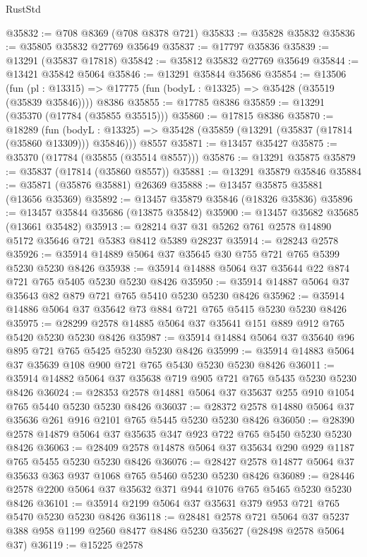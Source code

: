 \begin{lexlean}{RustStd}
\begin{coremodule}
@35832 := @708 @8369 (@708 @8378 @721)
@35833 := @35828 @35832
@35836 := @35805 @35832 @27769 @35649
@35837 := @17797 @35836
@35839 := @13291 (@35837 @17818)
@35842 := @35812 @35832 @27769 @35649
@35844 := @13421 @35842 @5064
@35846 := @13291 @35844 @35686
@35854 := @13506
    (fun (pl : @13315) => @17775 (fun (bodyL : @13325) => @35428 (@35519 (@35839 @35846))))
    @8386
@35855 := @17785 @8386
@35859 := @13291 (@35370 (@17784 (@35855 @35515)))
@35860 := @17815 @8386
@35870 := @18289
    (fun (bodyL : @13325) => @35428 (@35859 (@13291 (@35837 (@17814 (@35860 @13309))) @35846)))
    @8557
@35871 := @13457 @35427
@35875 := @35370 (@17784 (@35855 (@35514 @8557)))
@35876 := @13291 @35875
@35879 := @35837 (@17814 (@35860 @8557))
@35881 := @13291 @35879 @35846
@35884 := @35871 (@35876 @35881) @26369
@35888 := @13457 @35875 @35881 (@13656 @35369)
@35892 := @13457 @35879 @35846 (@18326 @35836)
@35896 := @13457 @35844 @35686 (@13875 @35842)
@35900 := @13457 @35682 @35685 (@13661 @35482)
@35913 := @28214 @37 @31 @5262 @761 @2578 @14890 @5172 @35646 @721 @5383 @8412 @5389 @28237
@35914 := @28243 @2578
@35926 := @35914 @14889 @5064 @37 @35645 @30 @755 @721 @765 @5399 @5230 @5230 @8426
@35938 := @35914 @14888 @5064 @37 @35644 @22 @874 @721 @765 @5405 @5230 @5230 @8426
@35950 := @35914 @14887 @5064 @37 @35643 @82 @879 @721 @765 @5410 @5230 @5230 @8426
@35962 := @35914 @14886 @5064 @37 @35642 @73 @884 @721 @765 @5415 @5230 @5230 @8426
@35975 := @28299 @2578 @14885 @5064 @37 @35641 @151 @889 @912 @765 @5420 @5230 @5230 @8426
@35987 := @35914 @14884 @5064 @37 @35640 @96 @895 @721 @765 @5425 @5230 @5230 @8426
@35999 := @35914 @14883 @5064 @37 @35639 @108 @900 @721 @765 @5430 @5230 @5230 @8426
@36011 := @35914 @14882 @5064 @37 @35638 @719 @905 @721 @765 @5435 @5230 @5230 @8426
@36024 := @28353 @2578 @14881 @5064 @37 @35637 @255 @910 @1054 @765 @5440 @5230 @5230 @8426
@36037 := @28372 @2578 @14880 @5064 @37 @35636 @261 @916 @2101 @765 @5445 @5230 @5230 @8426
@36050 := @28390 @2578 @14879 @5064 @37 @35635 @347 @923 @722 @765 @5450 @5230 @5230 @8426
@36063 := @28409 @2578 @14878 @5064 @37 @35634 @290 @929 @1187 @765 @5455 @5230 @5230 @8426
@36076 := @28427 @2578 @14877 @5064 @37 @35633 @363 @937 @1068 @765 @5460 @5230 @5230 @8426
@36089 := @28446 @2578 @2200 @5064 @37 @35632 @371 @944 @1076 @765 @5465 @5230 @5230 @8426
@36101 := @35914 @2199 @5064 @37 @35631 @379 @953 @721 @765 @5470 @5230 @5230 @8426
@36118 := @28481
    @2578
    @721
    @5064
    @37
    @5237
    @388
    @958
    @1199
    @2560
    @8477
    @8486
    @5230
    @35627
    (@28498 @2578 @5064 @37)
@36119 := @15225 @2578

\end{coremodule}
\end{lexlean}
